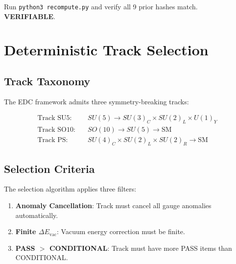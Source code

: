 \documentclass[11pt,a4paper]{article}
\begin{document}
\begin{trapbox}
\label{trap:rt03}
Run \texttt{python3 recompute.py} and verify all 9 prior hashes match. \textbf{VERIFIABLE}.
\end{trapbox}

\section{Deterministic Track Selection}
\label{sec:track-selection}

\subsection{Track Taxonomy}
\label{subsec:track-taxonomy}

The EDC framework admits three symmetry-breaking tracks:

\begin{equation}
\label{eq:track-taxonomy}
\begin{aligned}
\text{Track SU5}: \quad &SU(5) \to SU(3)_C \times SU(2)_L \times U(1)_Y \\
\text{Track SO10}: \quad &SO(10) \to SU(5) \to \text{SM} \\
\text{Track PS}: \quad &SU(4)_C \times SU(2)_L \times SU(2)_R \to \text{SM}
\end{aligned}
\end{equation}

\subsection{Selection Criteria}
\label{subsec:selection-criteria}

The selection algorithm applies three filters:

\begin{canonbox}
\label{box:selection-algorithm}
\begin{enumerate}[label=\textbf{F\arabic*}]
    \item \label{filter:anomaly} \textbf{Anomaly Cancellation}: Track must cancel all gauge anomalies automatically.
    \item \label{filter:finite} \textbf{Finite $\Delta E_{\text{vac}}$}: Vacuum energy correction must be finite.
    \item \label{filter:conditional} \textbf{PASS $>$ CONDITIONAL}: Track must have more PASS items than CONDITIONAL.
\end{enumerate}
\end{canonbox}
\end{document}
